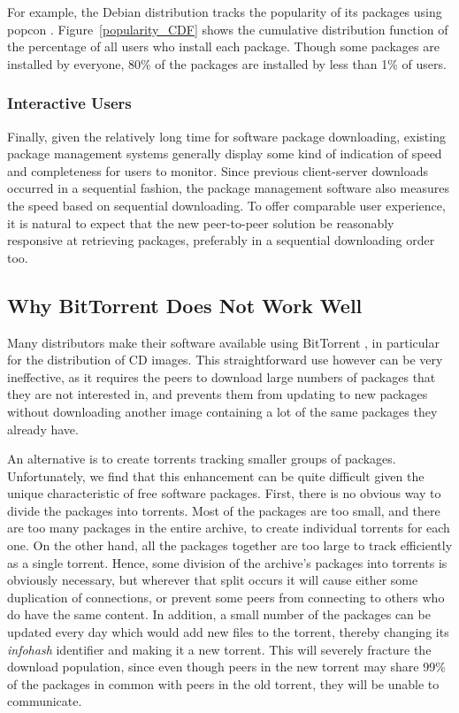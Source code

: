 \documentclass[conference]{IEEEtran}
\begin{document}
For example, the Debian distribution tracks the popularity of its
packages using popcon \cite{popcon}. Figure~\ref{popularity_CDF}
shows the cumulative distribution function of the percentage of all
users who install each package. Though some packages are installed
by everyone, 80\% of the packages are installed by less than 1\% of
users.

\subsubsection{Interactive Users}

Finally, given the relatively long time for software package downloading, existing package management systems generally display
some kind of indication of speed and completeness for users to
monitor. Since previous client-server downloads occurred in a sequential
fashion, the package management software also measures the speed
based on sequential downloading. To offer comparable user experience, it is natural to expect that
the new peer-to-peer solution be reasonably responsive at retrieving packages,
preferably in a sequential downloading order too. 

\subsection{Why BitTorrent Does Not Work Well}
\label{bittorrent}

Many distributors make their software available using
BitTorrent \cite{COHEN03}, in particular for the distribution of CD
images. This straightforward use however can be very ineffective, as it requires the
peers to download large numbers of packages that they are not
interested in, and prevents them from updating to new packages
without downloading another image containing a lot of the same
packages they already have.

An alternative is to create torrents tracking smaller groups of packages. Unfortunately, we find that this enhancement can be
quite difficult given the unique characteristic of free software packages.
First, there is no obvious way to divide the packages into torrents.
Most of the packages are too small, and there are too many packages
in the entire archive, to create individual torrents for each one.
On the other hand, all the packages together are too large to track
efficiently as a single torrent. Hence, some division of the archive's
packages into torrents is obviously necessary, but wherever that
split occurs it will cause either some duplication of connections,
or prevent some peers from connecting to others who do have the same
content. In addition, a small number of the packages can be updated every
day which would add new files to the torrent, thereby changing its
\emph{infohash} identifier and making it a new torrent. This will
severely fracture the download population, since even though peers in the
new torrent may share 99\% of the packages in common with peers in the
old torrent, they will be unable to communicate.
\end{document}
